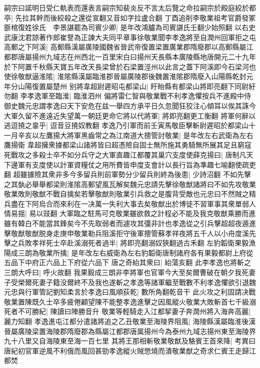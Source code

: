 嗣宗曰諾明日受仁軌表而還表言嗣宗知裴炎反不言太后覽之命拉嗣宗於殿庭絞於都亭|{
	先拉其幹而後絞殺之還從宣翻又音如字拉盧合翻}
丁酉追削李敬業祖考官爵發冢斵棺復姓徐氏　李景諶罷為司賓少卿|{
	是年改鴻臚為司賓諶氏壬翻少始照翻}
以右史武康沈君諒著作郎崔詧為正諫大夫同平章事徐敬業聞李孝逸將至自潤州回軍拒之屯高郵之下阿溪|{
	高郵縣漢屬廣陵國魏省晉武帝復置梁置廣業郡隋廢郡以高郵縣屬江都郡唐屬揚州九域志在州西北一百里宋白曰揚州天長縣本廣陵縣地唐開元二十九年於下阿置千秋縣天寶五年改天長梁曾於石梁置涇州以此言之蓋下阿溪即今石梁河也}
使徐敬猷逼淮隂|{
	淮隂縣漢屬臨淮郡晉屬廣陵郡後魏置淮隂郡隋廢入山陽縣乾封元年分山陽復置屬楚州}
别將韋超尉遲昭屯都梁山|{
	盱眙縣有都梁山將即亮翻下同尉紆勿翻}
李孝逸軍至臨淮|{
	臨淮泗州}
偏將雷仁智與敬業戰不利孝逸懼按兵不進殿中侍御史魏元忠謂孝逸曰天下安危在兹一舉四方承平日久忽聞狂狡注心傾耳以俟其誅今大軍久留不進遠近失望萬一朝廷更命它將以代將軍|{
	將即亮翻更工衡翻}
將軍何辭以逃逗撓之辠乎|{
	逗音豆撓奴教翻}
孝逸乃引軍而前壬寅馬敬臣擊斬尉遲昭於都梁山十一月辛亥以左鷹揚大將軍黑齒常之為江南道大摠管討敬業|{
	是年改左右武衛為左右鷹揚衛}
韋超擁衆據都梁山諸將皆曰超憑險自固士無所施其勇騎無所展其足且窮寇死戰攻之多殺士卒不如分兵守之大軍直趣江都覆其巢穴支度使薛克揚曰|{
	唐制凡天下邊軍有支度使以計軍資糧仗之用所費皆申度支會計以長行旨為準趣七喻翻使疏吏翻}
超雖據險其衆非多今多留兵則前軍勢分少留兵則終為後患|{
	少詩沼翻}
不如先擊之其埶必舉舉都梁則淮隂高郵望風瓦解矣魏元忠請先擊徐敬猷諸將曰不如先攻敬業敬業敗則敬猷不戰自擒矣若擊敬猷則敬業引兵救之是腹背受敵也元忠曰不然賊之精兵盡在下阿烏合而來利在一决萬一失利大事去矣敬猷出於博徒不習軍事其衆單弱人情易揺|{
	易以豉翻}
大軍臨之駐馬可克敬業雖欲救之計程必不能及我克敬猷乘勝而進雖有韓白不能當其鋒矣今不先取弱者而遽攻其彊非計也孝逸從之引兵擊超超夜遁進擊敬猷敬猷脱身走庚申敬業勒兵阻溪拒守後軍摠管蘇孝祥夜將五千人以小舟度溪先擊之兵敗孝祥死士卒赴溪溺死者過半|{
	將即亮翻溺奴狹翻過古禾翻}
左豹韜衛果毅漁陽成三朗為敬業所擒|{
	是年改左右威衛為左右豹韜衛唐制諸府各有果毅都尉上府從五品下中府正六品上下府從六品下}
唐之奇紿其衆曰|{
	紿蕩亥翻}
此李孝逸也將斬之三朗大呼曰|{
	呼火故翻}
我果毅成三朗非李將軍也官軍今大至矣爾曹破在朝夕我死妻子受榮爾死妻子籍没爾終不及我也遂斬之孝逸等諸軍繼至戰數不利孝逸懼欲引退魏元忠與行軍管記劉知柔言於孝逸曰風順荻乾|{
	數所角翻乾音干}
此火攻之利固請决戰敬業置陳既久士卒多疲倦顧望陳不能整孝逸進擊之因風縱火敬業大敗斬首七千級溺死者不可勝紀|{
	陳讀曰陣勝音升}
敬業等輕騎走入江都挈妻子奔潤州將入海奔高麗|{
	麗力知翻}
孝逸進屯江都分遣諸將追之乙丑敬業至海陵界阻風|{
	海陵縣漢屬臨淮後漢晉屬廣陵梁置海陵郡隋廢郡為縣屬江都郡唐属揚州今為泰州九域志揚州東至海陵界九十八里又自海陵東至海一百七里}
其將王那相斬敬業敬猷及駱賓王首來降|{
	考異曰唐紀初官軍逆風不利俄而風回甚勁孝逸縱火賊愳燒而潰敬業猷之奇求仁賓王走歸江都焚}


